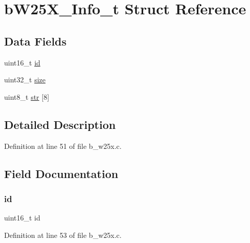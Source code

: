 \hypertarget{structb_w25_x___info__t}{}\section{b\+W25\+X\+\_\+\+Info\+\_\+t Struct Reference}
\label{structb_w25_x___info__t}
\subsection*{Data Fields}
\begin{DoxyCompactItemize}
\item 
uint16\+\_\+t \mbox{\hyperlink{structb_w25_x___info__t_a4fc3a0c58dfbd1e68224521185cb9384}{id}}
\item 
uint32\+\_\+t \mbox{\hyperlink{structb_w25_x___info__t_ab2c6b258f02add8fdf4cfc7c371dd772}{size}}
\item 
uint8\+\_\+t \mbox{\hyperlink{structb_w25_x___info__t_ac3d68b06876e51e9e7a74e389c73b09c}{str}} \mbox{[}8\mbox{]}
\end{DoxyCompactItemize}


\subsection{Detailed Description}


Definition at line 51 of file b\+\_\+w25x.\+c.



\subsection{Field Documentation}
\mbox{\label{structb_w25_x___info__t_a4fc3a0c58dfbd1e68224521185cb9384}} 
\subsubsection{\texorpdfstring{id}{id}}
{\footnotesize\ttfamily uint16\+\_\+t id}



Definition at line 53 of file b\+\_\+w25x.\+c.

\mbox{\label{structb_w25_x___info__t_ab2c6b258f02add8fdf4cfc7c371dd772}} 
